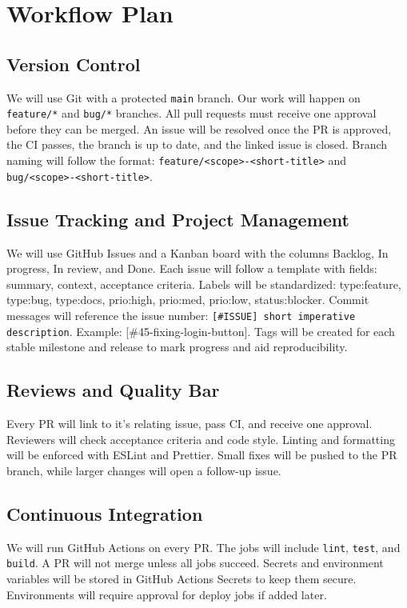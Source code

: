 \documentclass{article}
\begin{document}
\section{Workflow Plan}
\subsection*{Version Control}
We will use Git with a protected \texttt{main} branch. Our work will happen on \texttt{feature/*} and \texttt{bug/*} branches. All pull requests must receive one approval before they can be merged. An issue will be resolved once the PR is approved, the CI passes, the branch is up to date, and the linked issue is closed. Branch naming will follow the format:
\texttt{feature/<scope>-<short-title>} and \texttt{bug/<scope>-<short-title>}.

\subsection*{Issue Tracking and Project Management}
We will use GitHub Issues and a Kanban board with the columns Backlog, In progress, In review, and Done. Each issue will follow a template with fields: summary, context, acceptance criteria. Labels will be standardized: type:feature, type:bug, type:docs, prio:high, prio:med, prio:low, status:blocker. Commit messages will reference the issue number: \texttt{[\#ISSUE] short imperative description}. Example: [\#45-fixing-login-button]. Tags will be created for each stable milestone and release to mark progress and aid reproducibility.

\subsection*{Reviews and Quality Bar}
Every PR will link to it's relating issue, pass CI, and receive one approval. Reviewers will check acceptance criteria and code style. Linting and formatting will be enforced with ESLint and Prettier. Small fixes will be pushed to the PR branch, while larger changes will open a follow-up issue.

\subsection*{Continuous Integration}
We will run GitHub Actions on every PR. The jobs will include \texttt{lint}, \texttt{test}, and \texttt{build}. A PR will not merge unless all jobs succeed. Secrets and environment variables will be stored in GitHub Actions Secrets to keep them secure. Environments will require approval for deploy jobs if added later.
\end{document}
